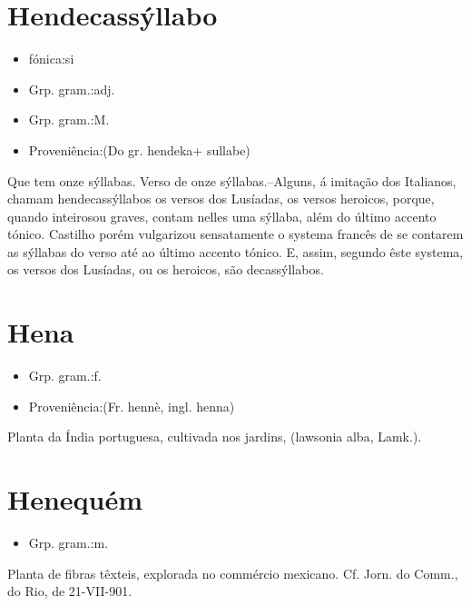 \documentclass{article}
\begin{document}
\section{Hendecassýllabo}
\begin{itemize}
\item {fónica:si}
\end{itemize}
\begin{itemize}
\item {Grp. gram.:adj.}
\end{itemize}
\begin{itemize}
\item {Grp. gram.:M.}
\end{itemize}
\begin{itemize}
\item {Proveniência:(Do gr. \textunderscore hendeka\textunderscore  + \textunderscore sullabe\textunderscore )}
\end{itemize}
Que tem onze sýllabas.
Verso de onze sýllabas.--Alguns, á imitação dos Italianos, chamam hendecassýllabos os versos dos \textunderscore Lusíadas\textunderscore , os versos heroicos, porque, quando \textunderscore inteiros\textunderscore  ou \textunderscore graves\textunderscore , contam nelles uma sýllaba, além do último accento tónico. Castilho porém vulgarizou sensatamente o systema francês de se contarem as sýllabas do verso até ao último accento tónico. E, assim, segundo êste systema, os versos dos \textunderscore Lusíadas\textunderscore , ou os \textunderscore heroicos\textunderscore , são decassýllabos.
\section{Hena}
\begin{itemize}
\item {Grp. gram.:f.}
\end{itemize}
\begin{itemize}
\item {Proveniência:(Fr. \textunderscore hennè\textunderscore , ingl. \textunderscore henna\textunderscore )}
\end{itemize}
Planta da Índia portuguesa, cultivada nos jardins, (\textunderscore lawsonia alba\textunderscore , Lamk.).
\section{Henequém}
\begin{itemize}
\item {Grp. gram.:m.}
\end{itemize}
Planta de fibras têxteis, explorada no commércio mexicano. Cf. \textunderscore Jorn. do Comm.\textunderscore , do Rio, de 21-VII-901.
\end{document}
